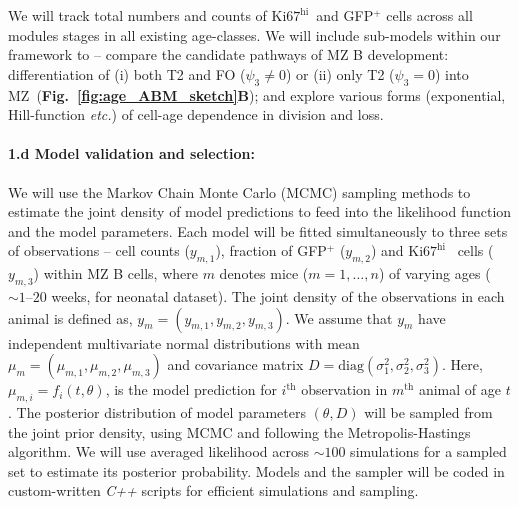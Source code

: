 \documentclass[11pt]{article}
\newcommand{\khi}{\ensuremath{\text{Ki67}^\text{hi}}~}
\newcommand{\para}[1]{\vspace*{-4.5mm}\paragraph{#1}}
\begin{document}
We will track total numbers and counts of \khi and GFP$^+$ cells across all modules stages in all existing age-classes.
We will include sub-models within our framework to -- compare the candidate pathways of MZ B development: differentiation of (i) both T2 and FO ($\psi_{3}\neq0$) or (ii) only T2 ($\psi_{3} = 0$) into MZ~(\textbf{Fig.~\ref{fig:age_ABM_sketch}B}); and explore various forms (exponential, Hill-function \textit{etc.}) of cell-age dependence in division and loss.

\para{{1.d Model validation and selection:}} \label{sec:stats-validation}

We will use the Markov Chain Monte Carlo (MCMC) sampling methods to estimate the joint density of model predictions to feed into the likelihood function and the model parameters. %
Each model will be fitted simultaneously to three sets of observations -- cell counts ($y_{m,1}$), fraction of {GFP$^+$} ($y_{m,2}$) and {\khi} cells ($y_{m,3}$) within MZ B cells, where $m$ denotes mice ($m = 1,\ldots,n$) of varying ages ($\sim1\text{--}20$ weeks, for neonatal dataset).
The joint density of the observations in each animal is defined as, $y_{m}=(y_{m,1}, y_{m,2}, y_{m,3})$.
We assume that $y_{m}$ have independent multivariate normal distributions with mean $\mu_{m}=(\mu_{m,1}, \mu_{m,2}, \mu_{m,3})$ and covariance matrix $D = \text{diag}(\sigma_{1}^{2}, \sigma_{2}^{2}, \sigma_{3}^{2})$.
Here, $\mu_{m, i} = f_{i}(t, \theta)$, is the model prediction for  $i^{\text{th}}$ observation in $m^{\text{th}}$ animal of age $t$.
The posterior distribution of model parameters $(\theta, D)$ will be sampled from the joint prior density, using MCMC and following the Metropolis-Hastings algorithm. %
We will use averaged likelihood across $\sim100$ simulations for a sampled set to estimate its posterior probability. 
Models and the sampler will be coded in custom-written \textit{C++} scripts for efficient simulations and sampling.
\end{document}
